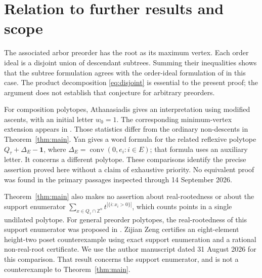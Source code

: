 \documentclass[11pt]{article}
\newcommand{\Z}{\mathbb Z}
\begin{document}
\section{Relation to further results and scope}

The associated arbor preorder has the root as its maximum vertex. Each
order ideal is a disjoint union of descendant subtrees. Summing their
inequalities shows that the subtree formulation agrees with the
order-ideal formulation of \cite[Conjecture~4.4]{AC} in this case.
The product decomposition \eqref{eq:disjoint} is essential to the present
proof; the argument does not establish that conjecture for arbitrary
preorders.

For composition polytopes, Athanasiadis \cite[Proposition~4.2]{Athanasiadis}
gives an interpretation using modified ascents, with an initial letter
$w_0=1$. The corresponding minimum-vertex extension appears in
\cite[Proposition~4.5]{AC}. Those statistics differ from the ordinary
non-descents in Theorem~\ref{thm:main}. Yan
\cite[Corollary~5.4]{Yan} gives a word formula for the related reflexive
polytope $Q_\tau+\Delta_E-\mathbf1$, where
$\Delta_E=\operatorname{conv}(0,e_i:i\in E)$; that formula uses an
auxiliary letter. It concerns a different polytope. These comparisons
identify the precise assertion proved here without a claim of exhaustive
priority. No equivalent proof was found in the primary passages inspected
through 14 September 2026.

Theorem~\ref{thm:main} also makes no assertion about real-rootedness or
about the support enumerator
$\sum_{x\in Q_\tau\cap\Z^n}t^{|\{i:x_i>0\}|}$, which counts points
in a single undilated polytope. For general preorder polytopes, the
real-rootedness of this support enumerator was proposed in
\cite[Conjecture~5.3]{AC}. Zijian Zeng
\cite[Proposition~3.1 and Theorem~4.2]{ZengSupport} certifies an
eight-element height-two poset counterexample using exact support
enumeration and a rational non-real-root certificate. We use the author
manuscript dated 31 August 2026 for this comparison. That result concerns
the support enumerator, and is not a counterexample to
Theorem~\ref{thm:main}.
\end{document}
